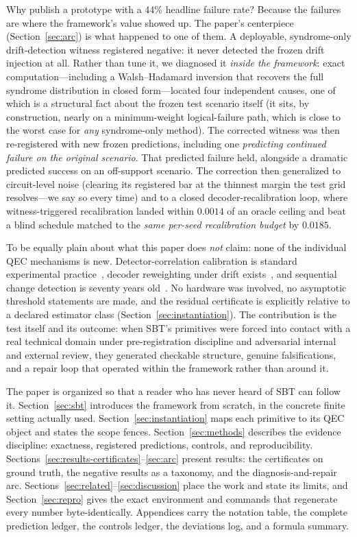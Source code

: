 \documentclass[11pt]{article}
\theoremstyle{definition}
\begin{document}
Why publish a prototype with a 44\% headline failure rate? Because the failures are where the framework's value showed up. The paper's centerpiece (Section~\ref{sec:arc}) is what happened to one of them. A deployable, syndrome-only drift-detection witness registered negative: it never detected the frozen drift injection at all. Rather than tune it, we diagnosed it \emph{inside the framework}: exact computation---including a Walsh--Hadamard inversion that recovers the full syndrome distribution in closed form---located four independent causes, one of which is a structural fact about the frozen test scenario itself (it sits, by construction, nearly on a minimum-weight logical-failure path, which is close to the worst case for \emph{any} syndrome-only method). The corrected witness was then re-registered with new frozen predictions, including one \emph{predicting continued failure on the original scenario}. That predicted failure held, alongside a dramatic predicted success on an off-support scenario. The correction then generalized to circuit-level noise (clearing its registered bar at the thinnest margin the test grid resolves---we say so every time) and to a closed decoder-recalibration loop, where witness-triggered recalibration landed within $0.0014$ of an oracle ceiling and beat a blind schedule matched to the \emph{same per-seed recalibration budget} by $0.0185$. 

To be equally plain about what this paper does \emph{not} claim: none of the individual QEC mechanisms is new. Detector-correlation calibration is standard experimental practice~\cite{google2023suppressing}, decoder reweighting under drift exists~\cite{dgr2023reweighting}, and sequential change detection is seventy years old~\cite{page1954continuous}. No hardware was involved, no asymptotic threshold statements are made, and the residual certificate is explicitly relative to a declared estimator class (Section~\ref{sec:instantiation}). The contribution is the test itself and its outcome: when SBT's primitives were forced into contact with a real technical domain under pre-registration discipline and adversarial internal and external review, they generated checkable structure, genuine falsifications, and a repair loop that operated within the framework rather than around it.

The paper is organized so that a reader who has never heard of SBT can follow it. Section~\ref{sec:sbt} introduces the framework from scratch, in the concrete finite setting actually used. Section~\ref{sec:instantiation} maps each primitive to its QEC object and states the scope fences. Section~\ref{sec:methods} describes the evidence discipline: exactness, registered predictions, controls, and reproducibility. Sections~\ref{sec:results-certificates}--\ref{sec:arc} present results: the certificates on ground truth, the negative results as a taxonomy, and the diagnosis-and-repair arc. Sections~\ref{sec:related}--\ref{sec:discussion} place the work and state its limits, and Section~\ref{sec:repro} gives the exact environment and commands that regenerate every number byte-identically. Appendices carry the notation table, the complete prediction ledger, the controls ledger, the deviations log, and a formula summary.
\end{document}
